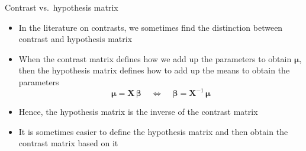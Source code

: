 \documentclass[aspectratio=169]{beamer}
\newcommand{\mat}[1]{\mathbf{#1}}
\newcommand{\gvect}[1]{\boldsymbol{#1}}
\begin{document}
\begin{frame}[<+->]{Contrast vs.\ hypothesis matrix}
  \begin{itemize}
    \item In the literature on contrasts, we sometimes find the distinction
      between contrast and hypothesis matrix \citep[e.\,g.,][]{Schad2020}
    \item When the contrast matrix defines how we add up the parameters to
      obtain $\gvect{\mu}$, then the hypothesis matrix defines how to add up the
      means to obtain the parameters
  \[
    \boldsymbol{\mu} = \mat{X} \, \gvect{\beta} ~~~~~\Leftrightarrow ~~~~~
    \boldsymbol{\beta} = \mat{X}^{-1} \, \gvect{\mu}
  \]
    \item Hence, the hypothesis matrix is the inverse of the contrast matrix
    \item It is sometimes easier to define the hypothesis matrix and then obtain
      the contrast matrix based on it
  \end{itemize}
\end{frame}
\end{document}
